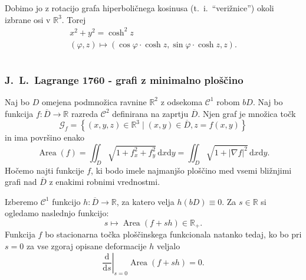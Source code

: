 \documentclass[8pt]{beamer}
\theoremstyle{definition}
\theoremstyle{remark}
\theoremstyle{plain}
\numberwithin{equation}{section}  %
\begin{document}
\begin{frame}
\begin{columns}
\begin{column}{0.5\textwidth}
            \vspace{0.8em}

            Dobimo jo z rotacijo grafa hiperboličnega kosinusa (t.~i.~“verižnice”) okoli izbrane osi v $\mathbb{R}^3$. Torej
            \begin{gather*}
                x^2+y^2=\cosh^2{z} \\
                (\varphi, z) \mapsto(\cos \varphi \cdot \cosh z, \sin \varphi \cdot \cosh z, z).
            \end{gather*}

        \end{column}
    \end{columns}

\end{frame}

\begin{frame}
    \frametitle{J.~L.~Lagrange 1760 - grafi z minimalno ploščino}

    Naj bo $D$ omejena podmnožica ravnine $\mathbb{R}^2$ z odsekoma $\mathscr{C}^1$ robom $b D$. Naj bo funkcija $f: \overline{D} \rightarrow \mathbb{R}$ razreda $\mathscr{C}^2$ definirana na zaprtju $\overline{D}$. Njen graf je množica točk
    \begin{equation*}
        \mathcal{G}_f=\left\{(x, y, z) \in \mathbb{R}^3 \mid(x, y) \in \overline{D}, z=f(x, y)\right\}    
    \end{equation*}
    in ima površino enako
    \begin{equation*}
        \operatorname{Area}(f)=\iint_{D} \sqrt{1+f_x^2+f_y^2} \, \mathrm{d} x \mathrm{d} y=\iint_{D} \sqrt{1+|\nabla f|^2} \, \mathrm{d} x \mathrm{d} y.    
    \end{equation*}
    Hočemo najti funkcije $f$, ki bodo imele najmanjšo ploščino med vsemi bližnjimi grafi nad $\overline{D}$ z enakimi robnimi vrednostmi.

    \vspace{0.8em}

    Izberemo $\mathscr{C}^1$ funkcijo $h: \overline{D} \rightarrow \mathbb{R}$, za katero velja $h(b D) \equiv 0$. Za $s \in \mathbb{R}$ si ogledamo naslednjo funkcijo:
    \begin{equation*}
        s \longmapsto \operatorname{Area}(f+s h) \in \mathbb{R}_+ .    
    \end{equation*}
    Funkcija $f$ bo stacionarna točka \textcolor{red1}{ploščinskega funkcionala} natanko tedaj, ko bo pri $s=0$ za vse zgoraj opisane deformacije $h$ veljalo
    \begin{equation*}
        \left.\frac{\mathrm{d}}{\mathrm{d} s}\right|_{s=0} \operatorname{Area}(f+s h)=0.
    \end{equation*}
    
\end{frame}
\end{document}
